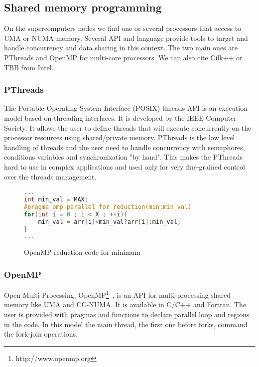 \subsection{Shared memory programming}
On the supercomputers nodes we find one or several processors that access to UMA or NUMA memory. 
Several API and language provide tools to target and handle concurrency and data sharing in this context. 
The two main ones are PThreads and OpenMP for multi-core processors. 
We can also cite Cilk++ or TBB from Intel.

\subsubsection{PThreads}
The Portable Operating System Interface (POSIX) threads API is an execution model based on threading interfaces. 
It is developed by the IEEE Computer Society. 
It allows the user to define threads that will execute concurrently on the processor resources using shared/private memory.
PThreads is the low level handling of threads and the user need to handle concurrency with semaphores, conditions variables and synchronization "by hand".
This makes the PThreads hard to use in complex applications and used only for very fine-grained control over the threads management. 

\begin{figure}[t!]
\begin{lstlisting}[language=C]
...
int min_val = MAX;
#pragma omp parallel for reduction(min:min_val)
for(int i = 0 ; i < X ; ++i){
	min_val = arr[i]<min_val?arr[i]:min_val;
}
...
\end{lstlisting}
\caption{OpenMP reduction code for minimum}
\label{code:openmp_reduction}
\end{figure}


\subsubsection{OpenMP}
Open Multi-Processing, OpenMP\footnote{http://www.openmp.org}~\cite{chapman2008using,supinski2017scaling,CDK+00}, is an API for multi-processing shared memory like UMA and CC-NUMA.
It is available in C/C++ and Fortran.
The user is provided with pragmas and functions to declare parallel loop and regions in the code. 
In this model the main thread, the first one before forks, command the fork-join operations. 

